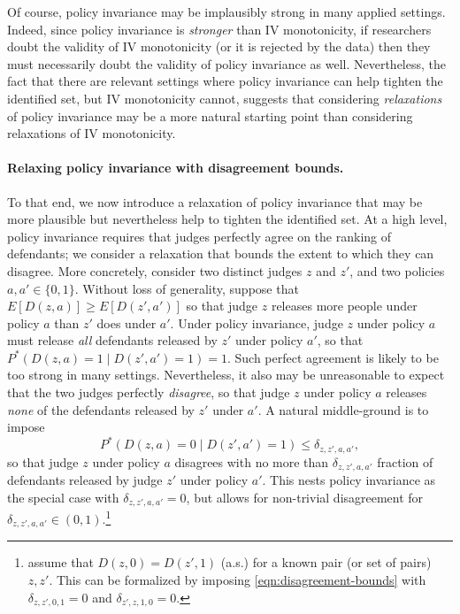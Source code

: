\documentclass[12pt]{article}%
\theoremstyle{definition}
\newcommand\1{\operatorname{I}\indicatorfence}
\begin{document}
Of course, policy invariance may be implausibly strong in
many applied settings. Indeed, since policy invariance is \emph{stronger} than
IV monotonicity, if researchers doubt the validity of IV monotonicity (or it is
rejected by the data) then they must necessarily doubt the validity of policy
invariance as well. Nevertheless, the fact that there are relevant settings
where policy invariance can help tighten the identified set, but IV monotonicity
cannot, suggests that considering \emph{relaxations} of policy invariance may be
a more natural starting point than considering relaxations of IV monotonicity.

\paragraph{Relaxing policy invariance with disagreement bounds.} To that end, we
now introduce a relaxation of policy invariance that may be more plausible but
nevertheless help to tighten the identified set. At a high level, policy
invariance requires that judges perfectly agree on the ranking of defendants; we
consider a relaxation that bounds the extent to which they can disagree. More
concretely, consider two distinct judges $z$ and $z'$, and two policies
$a, a'\in \{0,1\}$. Without loss of generality, suppose that
$E[D(z, a)] \geq E[D(z', a')]$ so that judge $z$ releases more people under policy
$a$ than $z'$ does under $a'$. Under policy invariance, judge $z$ under policy
$a$ must release \emph{all} defendants released by $z'$ under policy $a'$, so
that $P^*(D(z, a)=1 \mid D(z', a')=1) = 1$. Such perfect agreement is likely to be
too strong in many settings. Nevertheless, it also may be unreasonable to expect
that the two judges perfectly \emph{disagree}, so that judge $z$ under policy
$a$ releases \emph{none} of the defendants released by $z'$ under $a'$. A natural middle-ground is to impose
\begin{equation}\label{eqn:disagreement-bounds}
P^*(D(z, a)=0 \mid D(z', a')=1)\leq \delta_{z, z', a, a'},
\end{equation} so that judge $z$ under policy $a$ disagrees with no more than $\delta_{z, z', a, a'}$ fraction of defendants released by judge $z'$ under policy $a'$. This nests policy invariance as the special case with $\delta_{z, z', a, a'} = 0$, but allows for non-trivial disagreement for $\delta_{z, z', a, a'} \in (0,1)$.\footnote{\textcite{IcTa00} assume that $D(z,0) = D(z',1)$ (a.s.) for a known pair (or set of pairs) $z,z'$. This can be formalized by imposing \eqref{eqn:disagreement-bounds} with $\delta_{z,z',0,1} =0$ and  $\delta_{z',z,1,0} = 0$.}
\end{document}
